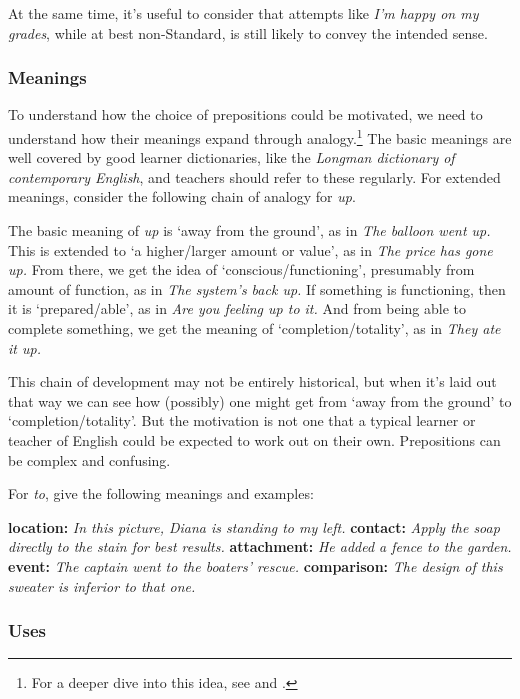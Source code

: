 At the same time, it's useful to consider that attempts like \textit{I'm happy on my grades}, while at best non-Standard, is still likely to convey the intended sense.

\subsubsection*{Meanings} \label{sec:preposition-meanings}

To understand how the choice of prepositions could be motivated, we need to
understand how their meanings expand through analogy.\footnote{For a deeper dive into this idea, see \citet{lakoff1980} and \citet{tyler2003}.} The basic meanings
are well covered by good learner dictionaries, like the \textit{Longman dictionary of
contemporary English}, and teachers should refer to these regularly. For extended
meanings, consider the following chain of analogy for \textit{up}.

The basic meaning of \textit{up} is `away from the ground', as in \textit{The balloon went up.}
This is extended to `a higher/larger amount or value', as in \textit{The price has gone up.}
From there, we get the idea of `conscious/functioning', presumably from amount
of function, as in \textit{The system's back up.} If something is functioning, then it is
`prepared/able', as in \textit{Are you feeling up to it.} And from being able to complete
something, we get the meaning of `completion/totality', as in \textit{They ate it up.} 

This chain of development may not be entirely historical, but when it's laid out
that way we can see how (possibly) one might get from `away from the ground'
to `completion/totality'. But the motivation is not one that a typical learner or
teacher of English could be expected to work out on their own. Prepositions can
be complex and confusing.

For \textit{to}, \citet{tyler2003} give the following meanings and examples:

\ea \label{ex:to-meanings}
    \ea \textbf{location:} \textit{In this picture, Diana is standing to my left.}
    \ex \textbf{contact:} \textit{Apply the soap directly to the stain for best results.}
    \ex \textbf{attachment:} \textit{He added a fence to the garden.}
    \ex \textbf{event:} \textit{The captain went to the boaters' rescue.}
    \ex \textbf{comparison:} \textit{The design of this sweater is inferior to that one.}
    \z
\z

\subsubsection*{Uses}

